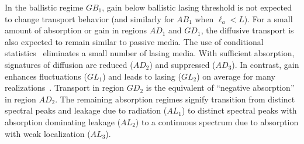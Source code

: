 In the ballistic regime $GB_1$, gain below ballistic lasing threshold is not expected to change transport behavior (and similarly for $AB_1$ when $\ell_a < L$). For a small amount of absorption or gain in regions $AD_1$ and $GD_1$, the diffusive transport is also expected to remain similar to passive media. The use of conditional statistics~\cite{2005_Yamilov_correlations} eliminates a small number of lasing media. With sufficient absorption, signatures of diffusion are reduced ($AD_2$) and suppressed ($AD_3$). In contrast, gain enhances fluctuations ($GL_1$) and leads to lasing ($GL_2$) on average for many realizations~\cite{1968_Letokhov}. Transport in region $GD_2$ is the equivalent of ``negative absorption'' in region $AD_2$. The remaining absorption regimes signify transition from distinct spectral peaks and leakage due to radiation ($AL_1$) to distinct spectral peaks with absorption dominating leakage ($AL_2$) to a continuous spectrum due to absorption with weak localization ($AL_3$).

